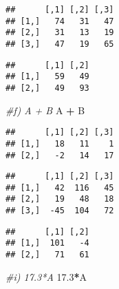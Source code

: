 \documentclass[
]{article}
\newenvironment{Shaded}{\begin{snugshade}}{\end{snugshade}}
\newcommand{\CommentTok}[1]{\textcolor[rgb]{0.56,0.35,0.01}{\textit{#1}}}
\newcommand{\FloatTok}[1]{\textcolor[rgb]{0.00,0.00,0.81}{#1}}
\newcommand{\KeywordTok}[1]{\textcolor[rgb]{0.13,0.29,0.53}{\textbf{#1}}}
\newcommand{\NormalTok}[1]{#1}
\newcommand{\OperatorTok}[1]{\textcolor[rgb]{0.81,0.36,0.00}{\textbf{#1}}}
\newcommand{\StringTok}[1]{\textcolor[rgb]{0.31,0.60,0.02}{#1}}
\begin{document}
\begin{verbatim}
##      [,1] [,2] [,3]
## [1,]   74   31   47
## [2,]   31   13   19
## [3,]   47   19   65
\end{verbatim}

\begin{Shaded}
\end{Shaded}

\begin{verbatim}
##      [,1] [,2]
## [1,]   59   49
## [2,]   49   93
\end{verbatim}

\begin{Shaded}
\begin{Highlighting}[]
  \CommentTok{#f) A + B}
\NormalTok{    A }\OperatorTok{+}\StringTok{ }\NormalTok{B}
\end{Highlighting}
\end{Shaded}

\begin{verbatim}
##      [,1] [,2] [,3]
## [1,]   18   11    1
## [2,]   -2   14   17
\end{verbatim}

\begin{Shaded}
\end{Shaded}

\begin{verbatim}
##      [,1] [,2] [,3]
## [1,]   42  116   45
## [2,]   19   48   18
## [3,]  -45  104   72
\end{verbatim}

\begin{Shaded}
\end{Shaded}

\begin{verbatim}
##      [,1] [,2]
## [1,]  101   -4
## [2,]   71   61
\end{verbatim}

\begin{Shaded}
\begin{Highlighting}[]
  \CommentTok{#i) 17.3*A}
    \FloatTok{17.3}\OperatorTok{*}\NormalTok{A}
\end{Highlighting}
\end{Shaded}
\end{document}

